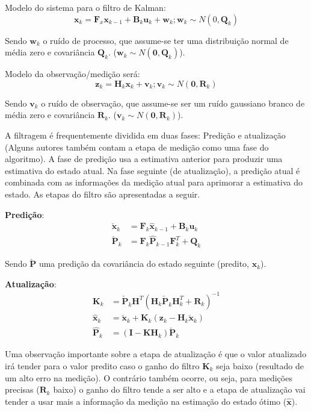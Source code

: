 Modelo do sistema para o filtro de Kalman:
\begin{equation}
\textbf{x}_k = \textbf{F}_x \textbf{x}_{k-1} + \textbf{B}_k \textbf{u}_k + \textbf{w}_k; \textbf{w}_k \sim N(0, \textbf{Q}_k)
\end{equation}

Sendo $\textbf{w}_k$ o ruído de processo, que assume-se ter uma distribuição normal de média zero e covariância $\textbf{Q}_k$. ($\textbf{w}_k \sim N(\textbf{0}, \textbf{Q}_k)$).

Modelo da observação/medição será:
\begin{equation}
\textbf{z}_k = \textbf{H}_k \textbf{x}_k + \textbf{v}_k; \textbf{v}_k \sim N(\textbf{0}, \textbf{R}_k)
\end{equation}

Sendo $\textbf{v}_k$ o ruído de observação, que assume-se ser um ruído gaussiano branco de média zero e covariância $\textbf{R}_k$. ($\textbf{v}_k \sim N(\textbf{0}, \textbf{R}_k)$).

A filtragem é frequentemente dividida em duas fases: Predição e atualização (Alguns autores também contam a etapa de medição como uma fase do algoritmo). A fase de predição usa a estimativa anterior para produzir uma estimativa do estado atual. Na fase seguinte (de atualização), a predição atual é combinada com as informações da medição atual para aprimorar a estimativa do estado. As etapas do filtro são apresentadas a seguir.

\textbf{Predição}:
\begin{align*}
    \check{\textbf{x}}_k &= \textbf{F}_k \hat{\textbf{x}}_{k-1} + \textbf{B}_k \textbf{u}_k\\
    \check{\textbf{P}}_k &= \textbf{F}_k \hat{\textbf{P}}_{k-1} \textbf{F}^T_k + \textbf{Q}_k
\end{align*}

Sendo $\check{\textbf{P}}$ uma predição da covariância do estado seguinte (predito, $\textbf{x}_k$).

\textbf{Atualização}:
\begin{align*}
    \textbf{K}_k &= \check{\textbf{P}}_k \textbf{H}^T \left( \textbf{H}_k \check{\textbf{P}}_k \textbf{H}^T_k + \textbf{R}_k\right)^{-1}\\
    \hat{\textbf{x}}_k &= \check{\textbf{x}}_k + \textbf{K}_k\left( \textbf{z}_k - \textbf{H}_k \check{\textbf{x}}_k \right)\\
    \hat{\textbf{P}}_k &= \left(\textbf{I} - \textbf{KH}_k \right)\check{\textbf{P}}_k
\end{align*}

Uma observação importante sobre a etapa de atualização é que o valor atualizado irá tender para o valor predito caso o ganho do filtro $\textbf{K}_k$ seja baixo (resultado de um alto erro na medição). O contrário também ocorre, ou seja, para medições precisas ($\textbf{R}_k$ baixo) o ganho do filtro tende a ser alto e a etapa de atualização vai tender a usar mais a informação da medição na estimação do estado ótimo ($\hat{\textbf{x}}$). 
